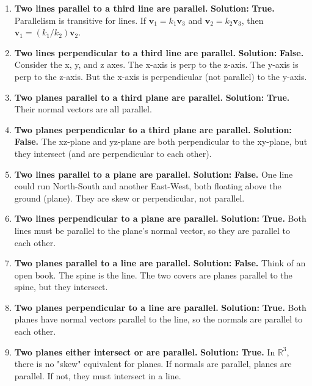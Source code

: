 \documentclass[11pt]{article}
\begin{document}
\begin{enumerate}[label=(\alph*)]
    \item \textbf{Two lines parallel to a third line are parallel.}
    \textbf{Solution:} \textbf{True.} Parallelism is transitive for lines. If $\mathbf{v}_1 = k_1 \mathbf{v}_3$ and $\mathbf{v}_2 = k_2 \mathbf{v}_3$, then $\mathbf{v}_1 = (k_1/k_2)\mathbf{v}_2$.

    \item \textbf{Two lines perpendicular to a third line are parallel.}
    \textbf{Solution:} \textbf{False.} Consider the x, y, and z axes. The x-axis is perp to the z-axis. The y-axis is perp to the z-axis. But the x-axis is perpendicular (not parallel) to the y-axis.

    \item \textbf{Two planes parallel to a third plane are parallel.}
    \textbf{Solution:} \textbf{True.} Their normal vectors are all parallel.

    \item \textbf{Two planes perpendicular to a third plane are parallel.}
    \textbf{Solution:} \textbf{False.} The xz-plane and yz-plane are both perpendicular to the xy-plane, but they intersect (and are perpendicular to each other).

    \item \textbf{Two lines parallel to a plane are parallel.}
    \textbf{Solution:} \textbf{False.} One line could run North-South and another East-West, both floating above the ground (plane). They are skew or perpendicular, not parallel.

    \item \textbf{Two lines perpendicular to a plane are parallel.}
    \textbf{Solution:} \textbf{True.} Both lines must be parallel to the plane's normal vector, so they are parallel to each other.

    \item \textbf{Two planes parallel to a line are parallel.}
    \textbf{Solution:} \textbf{False.} Think of an open book. The spine is the line. The two covers are planes parallel to the spine, but they intersect.

    \item \textbf{Two planes perpendicular to a line are parallel.}
    \textbf{Solution:} \textbf{True.} Both planes have normal vectors parallel to the line, so the normals are parallel to each other.

    \item \textbf{Two planes either intersect or are parallel.}
    \textbf{Solution:} \textbf{True.} In $\mathbb{R}^3$, there is no "skew" equivalent for planes. If normals are parallel, planes are parallel. If not, they must intersect in a line.


\end{enumerate}
\end{document}

